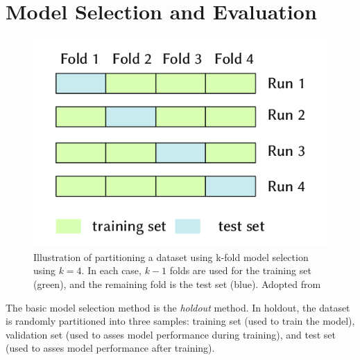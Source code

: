 % 

\section{Model Selection and Evaluation}
\label{sec:selection}

\begin{figure}[t]
	\includegraphics[scale=0.7]{kfold.png}
	\caption{
	Illustration of partitioning a dataset using k-fold model 
	selection using $k = 4$. In each case, $k - 1$ folds
	are used for the training set (green), and the remaining fold is
	the test set (blue). Adopted from \citep{pedregosa2015feature}}
	\label{fig:kfold}
\end{figure}

The basic model selection method is the \textit{holdout} method. 
In holdout, the dataset is randomly partitioned into three 
samples: training set (used to train the model),
validation set (used to asses model performance during training),
and test set (used to asses model performance after training).



